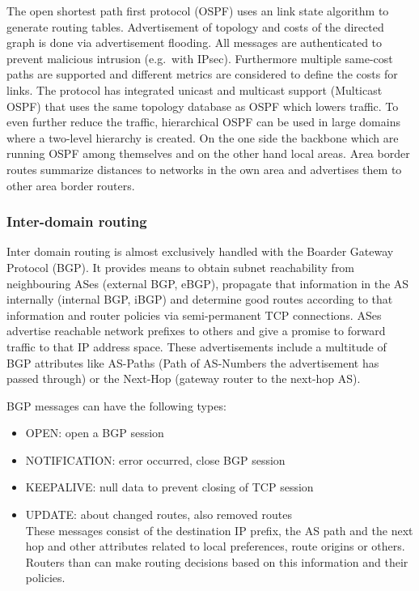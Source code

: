 The open shortest path first protocol (OSPF) uses an link state algorithm to generate routing tables.
Advertisement of topology and costs of the directed graph is done via advertisement flooding.
All messages are authenticated to prevent malicious intrusion (e.g.\ with IPsec).
Furthermore multiple same-cost paths are supported and different metrics are considered to define the costs for links.
The protocol has integrated unicast and multicast support (Multicast OSPF) that uses the same topology database as OSPF which lowers traffic.
To even further reduce the traffic, hierarchical OSPF can be used in large domains where a two-level hierarchy is created.
On the one side the backbone which are running OSPF among themselves and on the other hand local areas.
Area border routes summarize distances to networks in the own area and advertises them to other area border routers.

\subsubsection*{Inter-domain routing}
Inter domain routing is almost exclusively handled with the Boarder Gateway Protocol (BGP).
It provides means to obtain subnet reachability from neighbouring ASes (external BGP, eBGP), propagate that information in the AS internally (internal BGP, iBGP) and determine good routes according to that information and router policies via semi-permanent TCP connections.
ASes advertise reachable network prefixes to others and give a promise to forward traffic to that IP address space.
These advertisements include a multitude of BGP attributes like AS-Paths (Path of AS-Numbers the advertisement has passed through) or the Next-Hop (gateway router to the next-hop AS).

BGP messages can have the following types:
\begin{itemize}
  \item OPEN: open a BGP session
  \item NOTIFICATION: error occurred, close BGP session
  \item KEEPALIVE: null data to prevent closing of TCP session
  \item UPDATE: about changed routes, also removed routes\\
    These messages consist of the destination IP prefix, the AS path and the next hop and other attributes related to local preferences, route origins or others.
    Routers than can make routing decisions based on this information and their policies.
\end{itemize}

